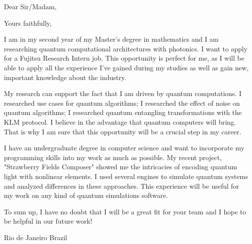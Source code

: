 \documentclass[12pt,a4paper,sans]{moderncv}        %
\begin{document}
	\clearpage
	\date{\today}
	\opening{Dear Sir/Madam,}
	\closing{Yours faithfully,}
	\makelettertitle
	I am in my second year of my Master's degree in mathematics and I am researching quantum computational architectures with photonics. I want to apply for a Fujitsu Research Intern job. This opportunity is perfect for me, as I will be able to apply all the experience I've gained during my studies as well as gain new, important knowledge about the industry.
	
	My research can support the fact that I am driven by quantum computations. I researched use cases for quantum algorithms; I researched the effect of noise on quantum algorithms; I researched quantum entangling transformations with the KLM protocol. I believe in the advantage that quantum computers will bring. That is why I am sure that this opportunity will be a crucial step in my career.
	
	I have an undergraduate degree in computer science and want to incorporate my programming skills into my work as much as possible. My recent project, "Strawberry Fields Composer" showed me the intricacies of encoding quantum light with nonlinear elements. I used several engines to simulate quantum systems and analyzed differences in these approaches. This experience will be useful for my work on any kind of quantum simulations software.
	
	To sum up, I have no doubt that I will be a great fit for your team and I hope to be helpful in our future work!
	

	
	\title{}
	\address{Rua Barata Ribeiro 194}{Rio de Janeiro}{ Brazil }
	\makeletterclosing
	\name{}{}
\end{document}
